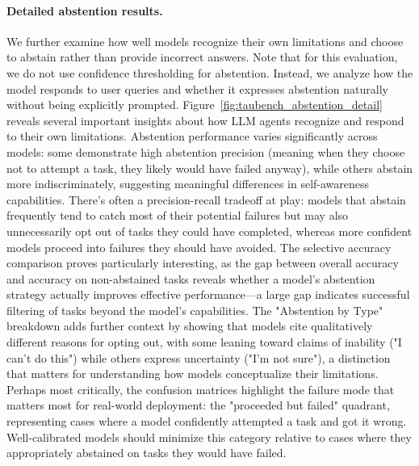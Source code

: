 \documentclass[11pt]{article}
\begin{document}
\paragraph{Detailed abstention results.} We further examine how well models recognize their own limitations and choose to abstain rather than provide incorrect answers. Note that for this evaluation, we do not use confidence thresholding for abstention. Instead, we analyze how the model responds to user queries and whether it expresses abstention naturally without being explicitly prompted. Figure~\ref{fig:taubench_abstention_detail} reveals several important insights about how LLM agents recognize and respond to their own limitations. Abstention performance varies significantly across models: some demonstrate high abstention precision (meaning when they choose not to attempt a task, they likely would have failed anyway), while others abstain more indiscriminately, suggesting meaningful differences in self-awareness capabilities. There's often a precision-recall tradeoff at play: models that abstain frequently tend to catch most of their potential failures but may also unnecessarily opt out of tasks they could have completed, whereas more confident models proceed into failures they should have avoided. The selective accuracy comparison proves particularly interesting, as the gap between overall accuracy and accuracy on non-abstained tasks reveals whether a model's abstention strategy actually improves effective performance—a large gap indicates successful filtering of tasks beyond the model's capabilities. The "Abstention by Type" breakdown adds further context by showing that models cite qualitatively different reasons for opting out, with some leaning toward claims of inability ("I can't do this") while others express uncertainty ("I'm not sure"), a distinction that matters for understanding how models conceptualize their limitations. Perhaps most critically, the confusion matrices highlight the failure mode that matters most for real-world deployment: the "proceeded but failed" quadrant, representing cases where a model confidently attempted a task and got it wrong. Well-calibrated models should minimize this category relative to cases where they appropriately abstained on tasks they would have failed.
\end{document}
